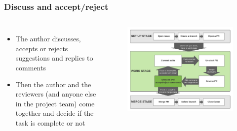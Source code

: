 \documentclass[aspectratio=169]{beamer} %
\begin{document}
\begin{frame}
	\frametitle{Discuss and accept/reject}
	\begin{columns}[c]

		\begin{itemize}
			\setlength\itemsep{1em}
			\item The author discusses, accepts or rejects suggestions
			and replies to comments
			\item Then the author and the reviewers
			(and anyone else in the project team)
			come together and decide if the task is complete or not
		\end{itemize}

		\vspace{-.75cm}
		\begin{figure}
			\centering
			\includegraphics[width=\textwidth]{./img/branch-pr-merge-cycle-S2-4.png}
		\end{figure}

	\end{columns}
\end{frame}
\end{document}
